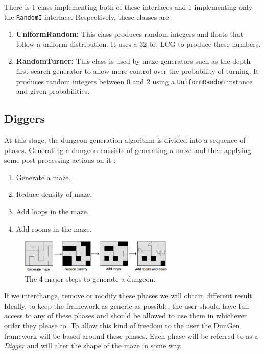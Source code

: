 There is 1 class implementing both of these interfaces and 1 implementing only the \texttt{RandomI} interface. Respectively, these classes are:
\begin{enumerate}
\item {\bf UniformRandom:} This class produces random integers and floats that follow a uniform distribution. It uses a 32-bit LCG to produce these numbers.
\item {\bf RandomTurner:} This class is used by maze generators such as the depth-first search generator to allow more control over the probability of turning. It produces random integers between 0 and 2 using a \texttt{UniformRandom} instance and given probabilities.
\end{enumerate}

\subsection{Diggers}
At this stage, the dungeon generation algorithm is divided into a sequence of phases. Generating a dungeon consists of generating a maze and then applying some post-processing actions on it \citep{JBuck}:
\begin{enumerate}
\item Generate a maze.
\item Reduce density of maze.
\item Add loops in the maze.
\item Add rooms in the maze.
\end{enumerate}
\begin{figure}[h!]
\centering
 \includegraphics[width=0.66\textwidth]{images/makeDungeon4steps.png}
\caption{The 4 major steps to generate a dungeon.}
\end{figure}

If we interchange, remove or modify these phases we will obtain different result. Ideally, to keep the framework as generic as possible, the user should have full access to any of these phases and should be allowed to use them in whichever order they please to. To allow this kind of freedom to the user the DunGen framework will be based around these phases. Each phase will be referred to as a {\em Digger} and will alter the shape of the maze in some way.

